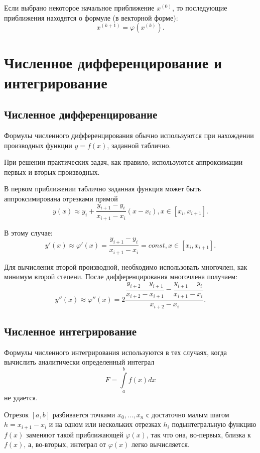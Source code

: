 \documentclass[12pt]{report}
\theoremstyle{definition}
\begin{document}
Если выбрано некоторое начальное приближение $x^{(0)}$, то последующие приближения
находятся о формуле (в векторной форме):
$$
x^{(k + 1)} = \varphi(x^{(k)}).
$$


\section{Численное дифференцирование и интегрирование}

\subsection{Численное дифференцирование}

Формулы численного дифференцирования обычно используются при нахождении
производных функции $y = f(x)$, заданной таблично.

При решении практических задач, как правило, используются аппроксимации
первых и вторых производных.

В первом приближении таблично заданная функция может быть аппроксимирована
отрезками прямой
$$
y(x) \approx y_i + \dfrac{y_{i + 1} - y_i}{x_{i+1} - x_i}(x - x_i), x \in [x_i, x_{i+1}].
$$

В этому случае:
$$
y'(x) \approx \varphi'(x) =  \dfrac{y_{i + 1} - y_i}{x_{i+1} - x_i} 
= const, x \in [x_i, x_{i+1}].
$$

Для вычисления второй производной, необходимо использовать многочлен, как минимум
второй степени. После дифференцирования многочлена получаем:
$$
y''(x) \approx
\varphi''(x) = 2 \dfrac{ \dfrac{y_{i+2} - y_{i+1}}{x_{i+2} - x_{i+1}} - 
\dfrac{y_{i+1} - y_i}{x_{i+1} - x_i}   }{x_{i + 2} - x_{i}}.
$$

\subsection{Численное интегрирование}

Формулы численного интегрирования используются в тех случаях, когда вычислить
аналитически определенный интеграл
$$
F = \int\limits_a^b f(x) dx
$$
не удается.

Отрезок $[a, b]$ разбивается точками $x_0, \dots, x_n$ с достаточно малым шагом
$h = x_{i+1} - x_i$ и на одном или нескольких отрезках $h_i$ подынтегральную
функцию $f(x)$ заменяют такой приближающей $\varphi(x)$, так что она, во-первых,
близка к $f(x)$, а, во-вторых, интеграл от $\varphi(x)$ легко вычисляется.
\end{document}
